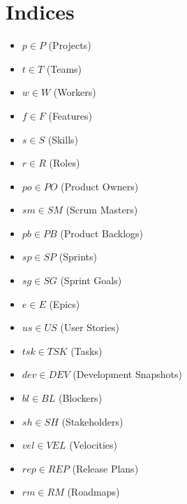 \documentclass{article}
\begin{document}
\section{Indices}
\begin{itemize}
    \item $p \in P$ (Projects)
    \item $t \in T$ (Teams)
    \item $w \in W$ (Workers)
    \item $f \in F$ (Features)
    \item $s \in S$ (Skills)
    \item $r \in R$ (Roles)
    \item $po \in PO$ (Product Owners)
    \item $sm \in SM$ (Scrum Masters)
    \item $pb \in PB$ (Product Backlogs)
    \item $sp \in SP$ (Sprints)
    \item $sg \in SG$ (Sprint Goals)
    \item $e \in E$ (Epics)
    \item $us \in US$ (User Stories)
    \item $tsk \in TSK$ (Tasks)
    \item $dev \in DEV$ (Development Snapshots)
    \item $bl \in BL$ (Blockers)
    \item $sh \in SH$ (Stakeholders)
    \item $vel \in VEL$ (Velocities)
    \item $rep \in REP$ (Release Plans)
    \item $rm \in RM$ (Roadmaps)
\end{itemize}
\end{document}
